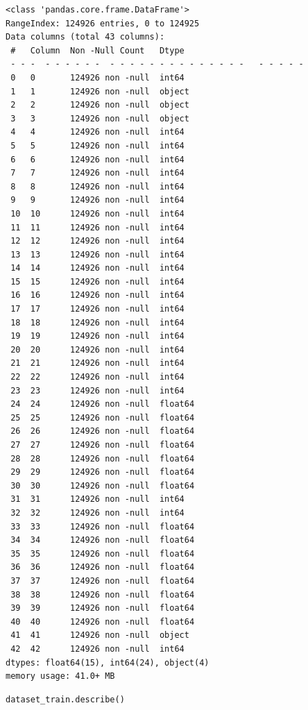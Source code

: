 \begin{verbatim}
<class 'pandas.core.frame.DataFrame'>
RangeIndex: 124926 entries, 0 to 124925
Data columns (total 43 columns):
 #   Column  Non -Null Count   Dtype  
 - - -  - - - - - -  - - - - - - - - - - - - - -   - - - - -  
 0   0       124926 non -null  int64  
 1   1       124926 non -null  object 
 2   2       124926 non -null  object 
 3   3       124926 non -null  object 
 4   4       124926 non -null  int64  
 5   5       124926 non -null  int64  
 6   6       124926 non -null  int64  
 7   7       124926 non -null  int64  
 8   8       124926 non -null  int64  
 9   9       124926 non -null  int64  
 10  10      124926 non -null  int64  
 11  11      124926 non -null  int64  
 12  12      124926 non -null  int64  
 13  13      124926 non -null  int64  
 14  14      124926 non -null  int64  
 15  15      124926 non -null  int64  
 16  16      124926 non -null  int64  
 17  17      124926 non -null  int64  
 18  18      124926 non -null  int64  
 19  19      124926 non -null  int64  
 20  20      124926 non -null  int64  
 21  21      124926 non -null  int64  
 22  22      124926 non -null  int64  
 23  23      124926 non -null  int64  
 24  24      124926 non -null  float64
 25  25      124926 non -null  float64
 26  26      124926 non -null  float64
 27  27      124926 non -null  float64
 28  28      124926 non -null  float64
 29  29      124926 non -null  float64
 30  30      124926 non -null  float64
 31  31      124926 non -null  int64  
 32  32      124926 non -null  int64  
 33  33      124926 non -null  float64
 34  34      124926 non -null  float64
 35  35      124926 non -null  float64
 36  36      124926 non -null  float64
 37  37      124926 non -null  float64
 38  38      124926 non -null  float64
 39  39      124926 non -null  float64
 40  40      124926 non -null  float64
 41  41      124926 non -null  object 
 42  42      124926 non -null  int64  
dtypes: float64(15), int64(24), object(4)
memory usage: 41.0+ MB
\end{verbatim}

\begin{verbatim}
dataset_train.describe()
\end{verbatim}

